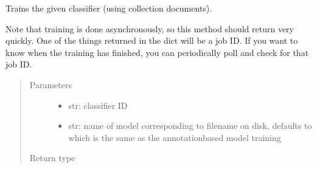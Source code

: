 \documentclass[letterpaper,10pt,english]{sphinxmanual}
\begin{document}
\begin{fulllineitems}
\begin{fulllineitems}
\label{\detokenize{autoapi/pine/client/client/index:pine.client.client.PineClient.classifier_train}}
\sphinxAtStartPar
Trains the given classifier (using collection documents).

\sphinxAtStartPar
Note that training is done asynchronously, so this method should return very quickly.  One
of the things returned in the dict will be a job ID.  If you want to know when the training
has finished, you can periodically poll {\hyperref[\detokenize{autoapi/pine/client/client/index:pine.client.client.PineClient.get_classifier_running_jobs}]{}} and check
for that job ID.
\begin{quote}\begin{description}
\item[{Parameters}] \leavevmode\begin{itemize}
\item {} 
\sphinxAtStartPar
{} \textendash{} str: classifier ID

\item {} 
\sphinxAtStartPar
{} \textendash{} str: name of model corresponding to filename on disk, defaults to
 which is the same as the annotation\sphinxhyphen{}based
model training

\end{itemize}

\item[{Return type}] \leavevmode
\sphinxAtStartPar
{}

\end{description}\end{quote}

\end{fulllineitems}


\end{fulllineitems}
\end{document}
